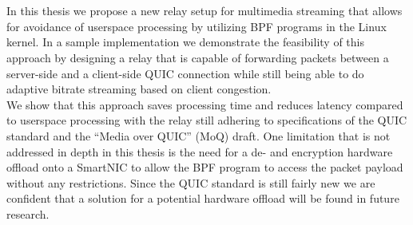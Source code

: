 \chapter{\abstractname}
In this thesis we propose a new relay setup for multimedia streaming that allows
for avoidance of userspace processing by utilizing BPF programs in the Linux kernel.
In a sample implementation we demonstrate the feasibility of this approach by
designing a relay that is capable of forwarding packets between a server-side 
and a client-side QUIC connection while still being able to do adaptive bitrate
streaming based on client congestion.
\\
We show that this approach saves processing time and reduces latency compared to
userspace processing with the relay still adhering to specifications of the QUIC
standard and the ``Media over QUIC'' (MoQ) draft.
One limitation that is not addressed in depth in this thesis is the need for a
de- and encryption hardware offload onto a SmartNIC to allow the BPF program to access
the packet payload without any restrictions.
Since the QUIC standard is still fairly new we are confident that a solution for a
potential hardware offload will be found in future research.
